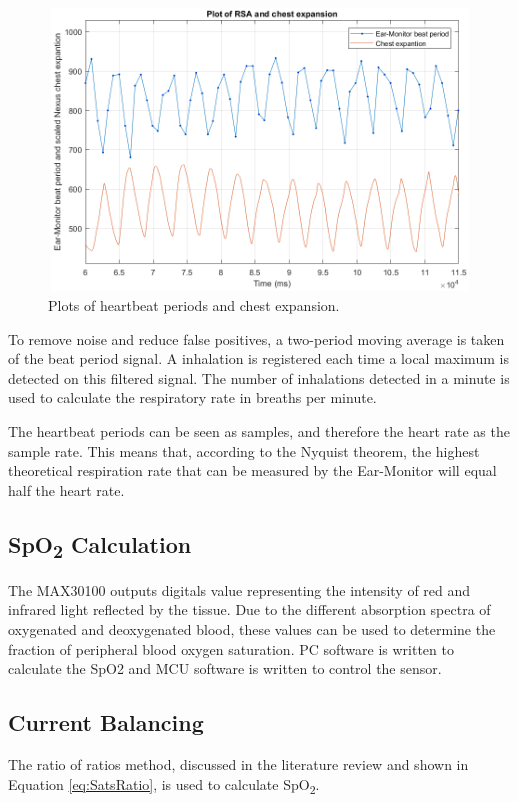 \begin{figure}[H]
   \centering
   \includegraphics[width=12cm,height=7.5cm]{figs/RSA.png}
   \caption{Plots of heartbeat periods and chest expansion.}
   \label{fig:RSA}
\end{figure}

To remove noise and reduce false positives, a two-period moving average is taken of the beat period signal. A inhalation is registered each time a local maximum is detected on this filtered signal. The number of inhalations detected in a minute is used to calculate the respiratory rate in breaths per minute.

\medskip

The heartbeat periods can be seen as samples, and therefore the heart rate as the sample rate. This means that, according to the Nyquist theorem, the highest theoretical respiration rate that can be measured by the Ear-Monitor will equal half the heart rate.

\subsection{SpO\textsubscript{2} Calculation}
The MAX30100 outputs digitals value representing the intensity of red and infrared light reflected by the tissue. Due to the different absorption spectra of oxygenated and deoxygenated blood, these values can be used to determine the fraction of peripheral blood oxygen saturation. PC software is written to calculate the SpO2 and MCU software is written to control the sensor. 

\subsection{Current Balancing}
The ratio of ratios method, discussed in the literature review and shown in Equation \ref{eq:SatsRatio}, is used to calculate SpO\textsubscript{2}.

